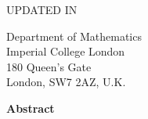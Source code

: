\begin{titlepage}

    \begin{center}
        \vspace*{4cm}
        
        \Huge
        \reporttitle
        
        \vspace{1cm}
        \Large
        \reportauthor
         
        \vspace{0.5cm}
        
        \LARGE
        UPDATED IN \reportupdated
        
        \vspace{1.5cm}
        
        \large
        Department of Mathematics\\
        Imperial College London\\
        180 Queen’s Gate\\
        London, SW7 2AZ, U.K.\\
        
        \vspace{0.5cm}
        
        \texttt{\href{mailto:\reportemail}{\reportemail}}
        
        \vspace{2cm}
        
        \large
        \textbf{Abstract}
        
        \vspace{0.5cm}

        \normalsize
        {\reportabstract}

        \vfill
        
    \end{center}
    
\end{titlepage}

\setcounter{page}{1}